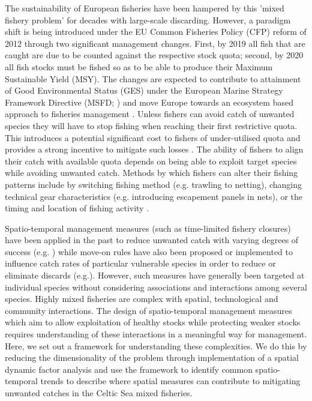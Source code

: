 \documentclass{nature}
\begin{document}
\begin{linenumbers}
The sustainability of European fisheries have been hampered by this 'mixed
fishery problem' for decades with large-scale discarding. However, a paradigm
shift is being introduced under the EU Common Fisheries Policy (CFP) reform of
2012 \cite{EuropeanParliamentandCounciloftheEuropeanUnion2013} through two
significant management changes. First, by 2019 all fish that are caught are due
to be counted against the respective stock quota; second, by 2020 all fish
stocks must be fished so as to be able to produce their Maximum Sustainable
Yield (MSY). The changes are expected to contribute to attainment of Good
Environmental Status (GES) under the European Marine Strategy Framework
Directive (MSFD; \cite{EuropeanParliament2008}) and move Europe towards an
ecosystem based approach to fisheries management \cite{Garcia2003}. Unless
fishers can avoid catch of unwanted species they will have to stop fishing when
reaching their first restrictive quota. This introduces a potential significant
cost to fishers of under-utilised quota\cite{Hoff2010a, Ulrich2016} and
provides a strong incentive to mitigate such losses \cite{Condie2013,
	Condie2013a}. The ability of fishers to align their catch with
available quota depends on being able to exploit target species while avoiding
unwanted catch. Methods by which fishers can alter their fishing patterns
include by switching fishing method (e.g. trawling to netting), changing
technical gear characteristics (e.g.  introducing escapement panels in nets),
or the timing and location of fishing activity \cite{Fulton2011b,
	vanPutten2012a}.

Spatio-temporal management measures (such as time-limited fishery closures)
have been applied in the past to reduce unwanted catch with varying degrees of
success (e.g. \cite{Needle2011, Holmes2011, Beare2010, Dinmore2003}) while
move-on rules have also been proposed or implemented to influence catch rates
of particular vulnerable species in order to reduce or eliminate discards
(e.g.\cite{Gardner2008, Dunn2011, Dunn2014a}). However, such measures have
generally been targeted at individual species without considering associations
and interactions among several species. Highly mixed fisheries are complex with
spatial, technological and community interactions. The design of
spatio-temporal management measures which aim to allow exploitation of healthy
stocks while protecting weaker stocks requires understanding of these
interactions in a meaningful way for management. Here, we set out a framework
for understanding these complexities. We do this by reducing the dimensionality
of the problem through implementation of a spatial dynamic factor analysis and
use the framework to identify common spatio-temporal trends to describe where
spatial measures can contribute to mitigating unwanted catches in the Celtic
Sea mixed fisheries.
 


\end{linenumbers}
\end{document}
